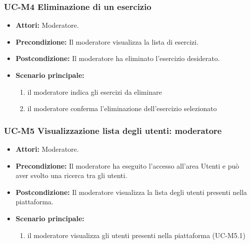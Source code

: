 \subsubsection{UC-M4 Eliminazione di un esercizio}
			\begin{itemize}
			\item \textbf{Attori:} Moderatore.
			\item \textbf{Precondizione:} Il moderatore visualizza la lista di esercizi.
			\item \textbf{Postcondizione:} Il moderatore ha eliminato l'esercizio desiderato.
			\item \textbf{Scenario principale:}
				\begin{enumerate}
					\item il moderatore indica gli esercizi da eliminare
					\item il moderatore conferma l'eliminazione dell'esercizio selezionato
				\end{enumerate}
		\end{itemize}

\subsubsection{UC-M5 Visualizzazione lista degli utenti: moderatore}
	\begin{itemize}
		\item \textbf{Attori:} Moderatore.
		\item \textbf{Precondizione:} Il moderatore ha eseguito l'accesso all'area Utenti e può aver svolto una ricerca tra gli utenti.
		\item \textbf{Postcondizione:} Il moderatore visualizza la lista degli utenti presenti nella piattaforma.
		\item \textbf{Scenario principale:}
			\begin{enumerate}
				\item il moderatore visualizza gli utenti presenti nella piattaforma (UC-M5.1)
			\end{enumerate}
	\end{itemize}
	
